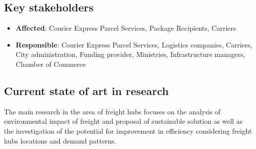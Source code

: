 \documentclass[
]{book}
\providecommand{\tightlist}{%
  \setlength{\itemsep}{0pt}\setlength{\parskip}{0pt}}
\begin{document}
\hypertarget{key-stakeholders-35}{%
\subsection*{Key stakeholders}\label{key-stakeholders-35}}

\begin{itemize}
\tightlist
\item
  \textbf{Affected}: Courier Express Parcel Services, Package Recipients, Carriers
\item
  \textbf{Responsible}: Courier Express Parcel Services, Logistics companies, Carriers, City administration, Funding provider, Ministries, Infrastructure managers, Chamber of Commerce
\end{itemize}

\hypertarget{current-state-of-art-in-research-35}{%
\subsection*{Current state of art in research}\label{current-state-of-art-in-research-35}}

The main research in the area of freight hubs focuses on the analysis of environmental impact of freight and proposal of sustainable solution as well as the investigation of the potential for improvement in efficiency considering freight hubs locations and demand patterns.
\end{document}
